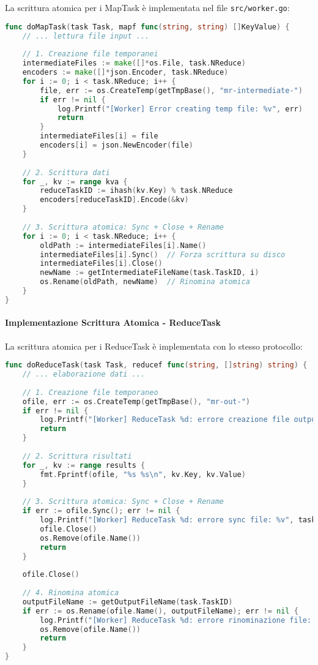 \documentclass[12pt,a4paper]{article}
\begin{document}
La scrittura atomica per i MapTask è implementata nel file \texttt{src/worker.go}:

\begin{lstlisting}[language=Go, caption=Scrittura atomica MapTask]
func doMapTask(task Task, mapf func(string, string) []KeyValue) {
    // ... lettura file input ...
    
    // 1. Creazione file temporanei
    intermediateFiles := make([]*os.File, task.NReduce)
    encoders := make([]*json.Encoder, task.NReduce)
    for i := 0; i < task.NReduce; i++ {
        file, err := os.CreateTemp(getTmpBase(), "mr-intermediate-")
        if err != nil {
            log.Printf("[Worker] Error creating temp file: %v", err)
            return
        }
        intermediateFiles[i] = file
        encoders[i] = json.NewEncoder(file)
    }
    
    // 2. Scrittura dati
    for _, kv := range kva {
        reduceTaskID := ihash(kv.Key) % task.NReduce
        encoders[reduceTaskID].Encode(&kv)
    }
    
    // 3. Scrittura atomica: Sync + Close + Rename
    for i := 0; i < task.NReduce; i++ {
        oldPath := intermediateFiles[i].Name()
        intermediateFiles[i].Sync()  // Forza scrittura su disco
        intermediateFiles[i].Close()
        newName := getIntermediateFileName(task.TaskID, i)
        os.Rename(oldPath, newName)  // Rinomina atomica
    }
}
\end{lstlisting}

\paragraph{Implementazione Scrittura Atomica - ReduceTask}

La scrittura atomica per i ReduceTask è implementata con lo stesso protocollo:

\begin{lstlisting}[language=Go, caption=Scrittura atomica ReduceTask]
func doReduceTask(task Task, reducef func(string, []string) string) {
    // ... elaborazione dati ...
    
    // 1. Creazione file temporaneo
    ofile, err := os.CreateTemp(getTmpBase(), "mr-out-")
    if err != nil {
        log.Printf("[Worker] ReduceTask %d: errore creazione file output: %v", task.TaskID, err)
        return
    }
    
    // 2. Scrittura risultati
    for _, kv := range results {
        fmt.Fprintf(ofile, "%s %s\n", kv.Key, kv.Value)
    }
    
    // 3. Scrittura atomica: Sync + Close + Rename
    if err := ofile.Sync(); err != nil {
        log.Printf("[Worker] ReduceTask %d: errore sync file: %v", task.TaskID, err)
        ofile.Close()
        os.Remove(ofile.Name())
        return
    }
    
    ofile.Close()
    
    // 4. Rinomina atomica
    outputFileName := getOutputFileName(task.TaskID)
    if err := os.Rename(ofile.Name(), outputFileName); err != nil {
        log.Printf("[Worker] ReduceTask %d: errore rinominazione file: %v", task.TaskID, err)
        os.Remove(ofile.Name())
        return
    }
}
\end{lstlisting}
\end{document}
